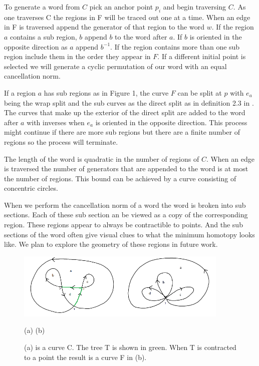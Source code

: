 \documentclass[11pt]{article}
\begin{document}
To generate a word from $C$ pick an anchor point $p_i$ and begin traversing $C.$ As one traverses C the regions in F will be traced out one at a time. When an edge in F is traversed append the generator of that region to the word $w.$ If the region $a$ contains a sub region, $b$ append $b$ to the word after $a$. If $b$ is oriented in the opposite direction as $a$ append $b^{-1}.$ If the region contains more than one sub region include them in the order they appear in $F.$ If a different initial point is selected we will generate a cyclic permutation of our word with an equal cancellation norm.

If a region $a$ has sub regions as in Figure 1, the curve $F$ can be split at $p$ with $e_a$ being the wrap split and the sub curves as the direct split as in definition 2.3 in \cite{parkerThesis}. The curves that make up the exterior of the direct split are added to the word after $a$ with inverses when $e_a$ is oriented in the opposite direction. This process might continue if there are more sub regions but there are a finite number of regions so the process will terminate.


The length of the word is quadratic in the number of regions of $C$. When an edge is traversed the number of generators that are appended to the word is at most the number of regions. This bound can be achieved by a  curve consisting of concentric circles.

When we perform the cancellation norm of a word the word is broken into sub sections. Each of these sub section an be viewed as a copy of the corresponding region. These regions appear to always be contractible to points. And the sub sections of the word often give visual clues to what the minimum homotopy looks like. We plan to explore the geometry of these regions in future work.




\begin{figure}
  \centering
  \includegraphics[height=1.25in]{Mouse1.png}\includegraphics[height=1.25in]{Mouse3.png}
  
  
 (a) \hspace{5cm}(b)
  \caption{(a) is a curve C. The tree T is shown in green. When T is contracted to a point the result is a curve F in (b).}\label{Figure 1}
 \end{figure}
\end{document}

